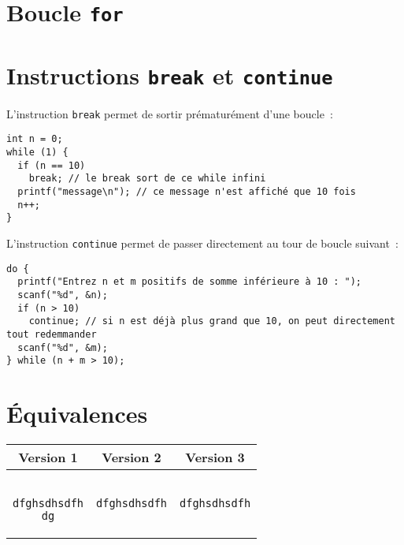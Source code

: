\documentclass[a4paper,10pt]{article}
\begin{document}
  \section{Boucle \texttt{for}}
  
  \section{Instructions \texttt{break} et \texttt{continue}}
  L'instruction \texttt{break} permet de sortir prématurément d'une boucle~:
  \begin{verbatim}
int n = 0;
while (1) {
  if (n == 10)
    break; // le break sort de ce while infini
  printf("message\n"); // ce message n'est affiché que 10 fois
  n++;
}
  \end{verbatim}
  L'instruction \texttt{continue} permet de passer directement au tour de boucle suivant~:
  \begin{verbatim}
do {
  printf("Entrez n et m positifs de somme inférieure à 10 : ");
  scanf("%d", &n);
  if (n > 10)
    continue; // si n est déjà plus grand que 10, on peut directement tout redemmander
  scanf("%d", &m);
} while (n + m > 10);
  \end{verbatim}
  
  \section{Équivalences}
  \begin{tabular}{c|c|c}
    Version 1 & Version 2 & Version 3\\
    \hline
    \begin{minipage}{4cm}
      \begin{verbatim}

dfghsdhsdfh
dg
      \end{verbatim}
    \end{minipage} &
    \begin{minipage}{4cm}
      \begin{verbatim}
dfghsdhsdfh
      \end{verbatim}
    \end{minipage} &
    \begin{minipage}{4cm}
      \begin{verbatim}
dfghsdhsdfh
      \end{verbatim}
    \end{minipage}
  \end{tabular}
\end{document}

